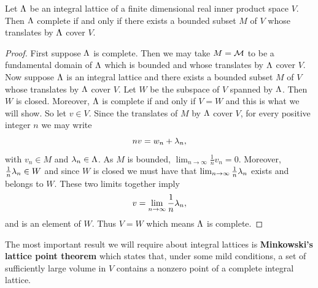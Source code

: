     \begin{proposition}\label{prop:complete_lattice_if_and_only_if_bounded_translates_cover}
      Let \(\Lambda\) be an integral lattice of a finite dimensional real inner product space \(V\). Then \(\Lambda\) complete if and only if there exists a bounded subset \(M\) of \(V\) whose translates by \(\Lambda\) cover \(V\).
    \end{proposition}
    \begin{proof}
      First suppose \(\Lambda\) is complete. Then we may take \(M = \mathcal{M}\) to be a fundamental domain of \(\Lambda\) which is bounded and whose translates by \(\Lambda\) cover \(V\). Now suppose \(\Lambda\) is an integral lattice and there exists a bounded subset \(M\) of \(V\) whose translates by \(\Lambda\) cover \(V\). Let \(W\) be the subspace of \(V\) spanned by \(\Lambda\). Then \(W\) is closed. Moreover, \(\Lambda\) is complete if and only if \(V = W\) and this is what we will show. So let \(v \in V\). Since the translates of \(M\) by \(\Lambda\) cover \(V\), for every positive integer \(n\) we may write
      \[
        nv = w_{n}+\lambda_{n},
      \]
      with \(v_{n} \in M\) and \(\lambda_{n} \in \Lambda\). As \(M\) is bounded, \(\lim_{n \to \infty}\frac{1}{n}v_{n} = 0\). Moreover, \(\frac{1}{n}\lambda_{n} \in W\) and since \(W\) is closed we must have that \(\lim_{n \to \infty}\frac{1}{n}\lambda_{n}\) exists and belongs to \(W\). These two limits together imply
      \[
        v = \lim_{n \to \infty}\frac{1}{n}\lambda_{n},
      \]
      and is an element of \(W\). Thus \(V = W\) which means \(\Lambda\) is complete.
    \end{proof}

    The most important result we will require about integral lattices is \textbf{Minkowski's lattice point theorem} which states that, under some mild conditions, a set of sufficiently large volume in \(V\) contains a nonzero point of a complete integral lattice.

